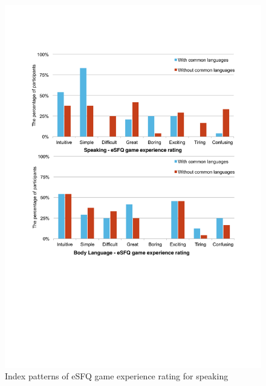 \begin{figure}[!h]
\centering
\includegraphics[width=1.0\columnwidth]{Figures/US_Consistent_Speaking.pdf}
\caption{Index patterns of eSFQ game experience rating for speaking}
\label{fig:US_Consistent_Speaking}
\end{figure}

